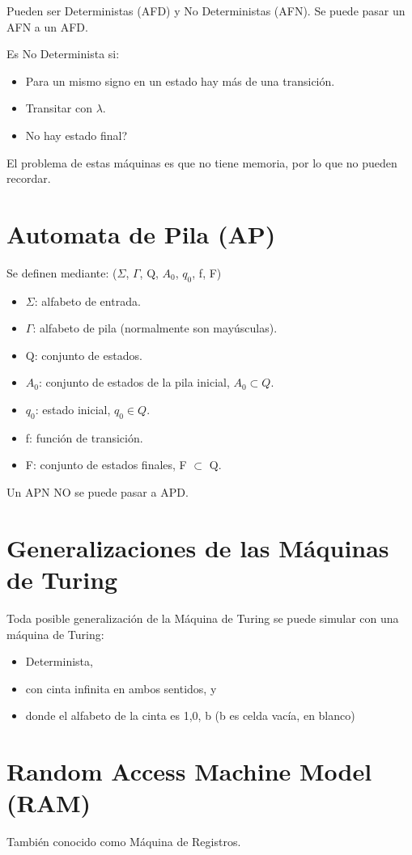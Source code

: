 Pueden ser Deterministas (AFD) y No Deterministas (AFN). Se puede pasar un AFN a un AFD.

Es No Determinista si:
\begin{itemize}
	\item Para un mismo signo en un estado hay más de una transición.
	\item Transitar con $\lambda$.
	\item No hay estado final?
\end{itemize}

El problema de estas máquinas es que no tiene memoria, por lo que no pueden recordar.

\section{Automata de Pila (AP)}
Se definen mediante: ($\Sigma$, $\Gamma$, Q, $A_0$, $q_0$, f, F)
\begin{itemize}
	\item $\Sigma$: alfabeto de entrada.
	\item $\Gamma$: alfabeto de pila (normalmente son mayúsculas).
	\item Q: conjunto de estados.
	\item $A_0$: conjunto de estados de la pila inicial, $A_0 \subset Q$.
	\item $q_0$: estado inicial, $q_0 \in Q$.
	\item f: función de transición.
	\item F: conjunto de estados finales, F $\subset$ Q.
\end{itemize}

Un APN NO se puede pasar a APD.

\section{Generalizaciones de las Máquinas de Turing}
Toda posible generalización de la Máquina de Turing se puede simular con una máquina de Turing:
\begin{itemize}
	\item Determinista,
	\item con cinta infinita en ambos sentidos, y \item donde el alfabeto de la cinta es {1,0, b} (b es celda vacía, en blanco)
\end{itemize}

\section{Random Access Machine Model (RAM)}
También conocido como Máquina de Registros.

